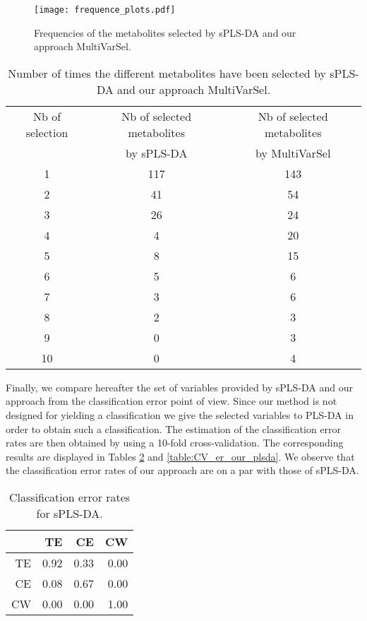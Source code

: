 \begin{figure}[!h]
\begin{center}
\texttt{[image: frequence\_plots.pdf]}
\caption{Frequencies of the metabolites selected by sPLS-DA and our approach \textsf{MultiVarSel}.\label{fig:freq}}
\end{center}
\end{figure}

\begin{table}[h!]
    \begin{tabular}{ccc}
    \hline
Nb of selection & Nb of selected metabolites & Nb of selected metabolites \\
  & by sPLS-DA &  by \textsf{MultiVarSel} \\
\hline
    1 & 117 &  143\\
  2 &  41& 54\\ 
  3 &  26 & 24\\ 
  4 &   4 & 20\\ 
  5 &   8 & 15\\ 
  6 &   5 & 6\\ 
  7 &   3 & 6\\ 
  8 &   2 & 3\\ 
  9 & 0  & 3\\ 
10 & 0 & 4\\
    \hline
    \end{tabular}
\caption{Number of times the different metabolites have been selected by sPLS-DA and our approach \textsf{MultiVarSel}.\label{table:bootstrap_er_plsda}}
\end{table}





Finally, we compare hereafter the set of variables provided by sPLS-DA
and our approach from the classification error point of view. Since our method is not designed for yielding a classification we give the selected variables to PLS-DA in order to obtain 
such a classification.  The estimation of the classification error rates are then obtained by using a 10-fold cross-validation.
The corresponding results are displayed in Tables \ref{table:CV_er_splsda} and \ref{table:CV_er_our_plsda}. We observe that the classification error rates of our approach
are on a par with those of sPLS-DA.


\begin{table}[ht]
\centering
\begin{tabular}{rrrr}
  \hline
 & TE & CE & CW \\ 
  \hline
TE & 0.92 & 0.33 & 0.00 \\ 
  CE & 0.08 & 0.67 & 0.00 \\ 
  CW & 0.00 & 0.00 & 1.00 \\ 
   \hline
\end{tabular}
\caption{Classification error rates for sPLS-DA.\label{table:CV_er_splsda}}
\end{table}

